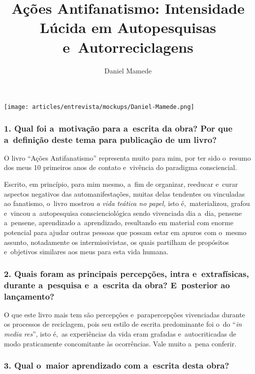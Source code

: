 \documentclass{gescons}
\author{Daniel Mamede}
\title{Ações Antifanatismo: Intensidade Lúcida em Autopesquisas e~Autorreciclagens}
\begin{document}
    \makeentrevistatitle

    \begin{multicols}{2}

\begin{center}
    \texttt{[image: articles/entrevista/mockups/Daniel-Mamede.png]}
\end{center}


\subsubsection{1. Qual foi a~motivação para a~escrita da obra? Por que a~definição deste tema para publicação de um livro?}

O livro “Ações Antifanatismo” representa muito para mim, por ter sido o~resumo dos meus 10 primeiros anos de contato e~vivência do paradigma consciencial. 

Escrito, em princípio, para mim mesmo, a~fim de organizar, reeducar e~curar aspectos negativos das automanifestações, muitas delas tendentes ou vinculadas ao fanatismo, o~livro mostrou \textit{a vida teática no papel,} isto é,~materializou, grafou e~vincou a~autopesquisa conscienciológica sendo vivenciada dia a~dia, pensene a~pensene, aprendizado a~aprendizado, resultando em material com enorme potencial para ajudar outras pessoas que possam estar em apuros com o~mesmo assunto, notadamente os intermissivistas, os quais partilham de propósitos e~objetivos similares aos meus para esta vida humana.



\subsubsection{2. Quais foram as principais percepções, intra e~extrafísicas, durante a~pesquisa e~a~escrita da obra? E~posterior ao lançamento?}

O que este livro mais tem são percepções e~parapercepções vivenciadas durante os processos de reciclagem, pois seu estilo de escrita predominante foi o~do “\textit{in media res}”, isto é,~as experiências da vida eram grafadas e~autocriticadas de modo praticamente concomitante às ocorrências. Vale muito a~pena conferir. 


\subsubsection{3.       Qual o~maior aprendizado com a~escrita desta obra?}


\end{multicols}
\end{document}
